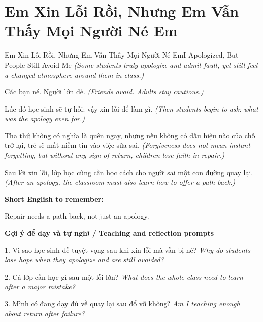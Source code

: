 \section{Em Xin Lỗi Rồi, Nhưng Em Vẫn Thấy Mọi Người Né Em}
\begin{truyen}{Em Xin Lỗi Rồi, Nhưng Em Vẫn Thấy Mọi Người Né Em}{I Apologized, But People Still Avoid Me}
\textit{(Some students truly apologize and admit fault, yet still feel a changed atmosphere around them in class.)}

Các bạn né. Người lớn dè.
\textit{(Friends avoid. Adults stay cautious.)}

Lúc đó học sinh sẽ tự hỏi: vậy xin lỗi để làm gì.
\textit{(Then students begin to ask: what was the apology even for.)}

Tha thứ không có nghĩa là quên ngay, nhưng nếu không có dấu hiệu nào của chỗ trở lại, trẻ sẽ mất niềm tin vào việc sửa sai.
\textit{(Forgiveness does not mean instant forgetting, but without any sign of return, children lose faith in repair.)}

\end{truyen}

\begin{baihoc}
Sau lời xin lỗi, lớp học cũng cần học cách cho người sai một con đường quay lại.
\textit{(After an apology, the classroom must also learn how to offer a path back.)}
\end{baihoc}

\begin{ghinhoanh}
\textbf{Short English to remember:}

Repair needs a path back, not just an apology.

\end{ghinhoanh}

\begin{tuhocnhanh}
\textbf{Gợi ý để dạy và tự nghĩ / Teaching and reflection prompts}

1. Vì sao học sinh dễ tuyệt vọng sau khi xin lỗi mà vẫn bị né? \textit{Why do students lose hope when they apologize and are still avoided?}

2. Cả lớp cần học gì sau một lỗi lớn? \textit{What does the whole class need to learn after a major mistake?}

3. Mình có đang dạy đủ về quay lại sau đổ vỡ không? \textit{Am I teaching enough about return after failure?}
\end{tuhocnhanh}
\ngancach

